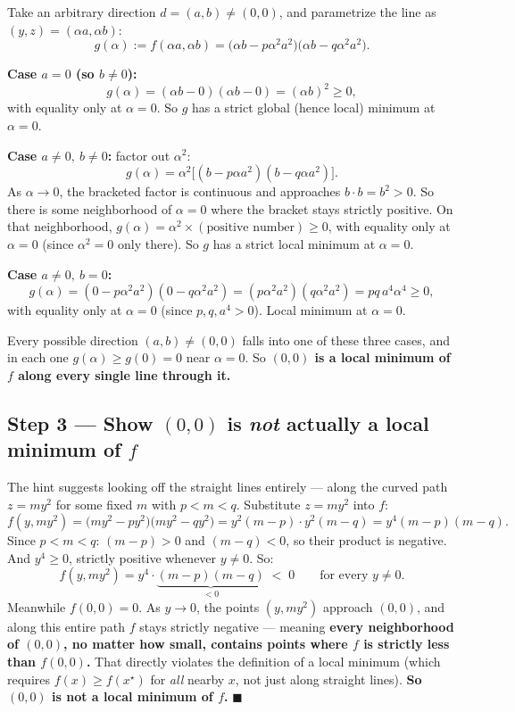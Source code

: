 \documentclass[11pt]{article}
\begin{document}
Take an arbitrary direction $d=(a,b)\ne(0,0)$, and parametrize the line as $(y,z) = (\alpha a,\alpha b)$:
\[
g(\alpha) := f(\alpha a,\alpha b) = \big(\alpha b - p\alpha^2a^2\big)\big(\alpha b - q\alpha^2a^2\big).
\]

\textbf{Case $a=0$ (so $b\ne0$):}
\[
g(\alpha) = (\alpha b - 0)(\alpha b - 0) = (\alpha b)^2 \ge 0,
\]
with equality only at $\alpha=0$. So $g$ has a strict global (hence local) minimum at $\alpha=0$.

\textbf{Case $a\ne0,\ b\ne0$:} factor out $\alpha^2$:
\[
g(\alpha) = \alpha^2\big[(b-p\alpha a^2)(b-q\alpha a^2)\big].
\]
As $\alpha\to0$, the bracketed factor is continuous and approaches $b\cdot b = b^2 > 0$. So there is some neighborhood of $\alpha=0$ where the bracket stays strictly positive. On that neighborhood, $g(\alpha) = \alpha^2 \times (\text{positive number})\ge 0$, with equality only at $\alpha=0$ (since $\alpha^2=0$ only there). So $g$ has a strict local minimum at $\alpha=0$.

\textbf{Case $a\ne0,\ b=0$:}
\[
g(\alpha) = (0-p\alpha^2a^2)(0-q\alpha^2a^2) = (p\alpha^2a^2)(q\alpha^2a^2) = pq\,a^4\alpha^4 \ge 0,
\]
with equality only at $\alpha=0$ (since $p,q,a^4>0$). Local minimum at $\alpha=0$.

Every possible direction $(a,b)\ne(0,0)$ falls into one of these three cases, and in each one $g(\alpha)\ge g(0)=0$ near $\alpha=0$. So \textbf{$(0,0)$ is a local minimum of $f$ along every single line through it.}

\subsection*{Step 3 --- Show $(0,0)$ is \emph{not} actually a local minimum of $f$}

The hint suggests looking off the straight lines entirely --- along the curved path $z=my^2$ for some fixed $m$ with $p<m<q$. Substitute $z=my^2$ into $f$:
\[
f(y,my^2) = \big(my^2-py^2\big)\big(my^2-qy^2\big) = y^2(m-p)\cdot y^2(m-q) = y^4(m-p)(m-q).
\]
Since $p<m<q$: $(m-p)>0$ and $(m-q)<0$, so their product is negative. And $y^4 \ge 0$, strictly positive whenever $y\ne0$. So:
\[
f(y,my^2) = y^4 \cdot \underbrace{(m-p)(m-q)}_{<0} \;<\; 0 \qquad \text{for every } y\ne0.
\]
Meanwhile $f(0,0)=0$. As $y\to0$, the points $(y,my^2)$ approach $(0,0)$, and along this entire path $f$ stays strictly negative --- meaning \textbf{every neighborhood of $(0,0)$, no matter how small, contains points where $f$ is strictly less than $f(0,0)$.} That directly violates the definition of a local minimum (which requires $f(x)\ge f(x^\star)$ for \emph{all} nearby $x$, not just along straight lines). \textbf{So $(0,0)$ is not a local minimum of $f$.} $\blacksquare$
\end{document}
